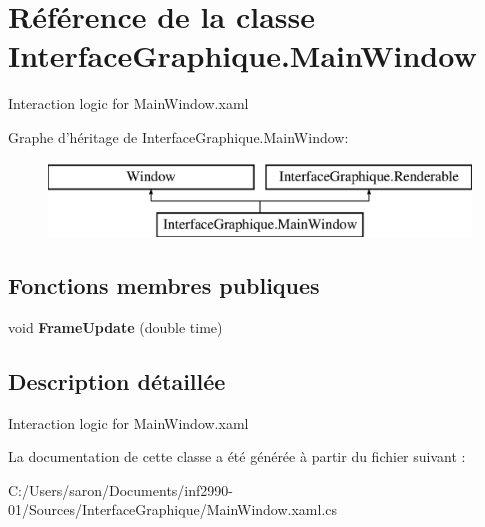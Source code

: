 \hypertarget{class_interface_graphique_1_1_main_window}{\section{Référence de la classe Interface\-Graphique.\-Main\-Window}
\label{class_interface_graphique_1_1_main_window}
}


Interaction logic for Main\-Window.\-xaml  


Graphe d'héritage de Interface\-Graphique.\-Main\-Window\-:\begin{figure}[H]
\begin{center}
\leavevmode
\includegraphics[height=2.000000cm]{class_interface_graphique_1_1_main_window}
\end{center}
\end{figure}
\subsection*{Fonctions membres publiques}
\begin{DoxyCompactItemize}
\item 
\hypertarget{class_interface_graphique_1_1_main_window_af11d0f6c1d6519e421d5704f6a19c934}{void {\bfseries Frame\-Update} (double time)}\label{class_interface_graphique_1_1_main_window_af11d0f6c1d6519e421d5704f6a19c934}

\end{DoxyCompactItemize}


\subsection{Description détaillée}
Interaction logic for Main\-Window.\-xaml 



La documentation de cette classe a été générée à partir du fichier suivant \-:\begin{DoxyCompactItemize}
\item 
C\-:/\-Users/saron/\-Documents/inf2990-\/01/\-Sources/\-Interface\-Graphique/Main\-Window.\-xaml.\-cs\end{DoxyCompactItemize}
